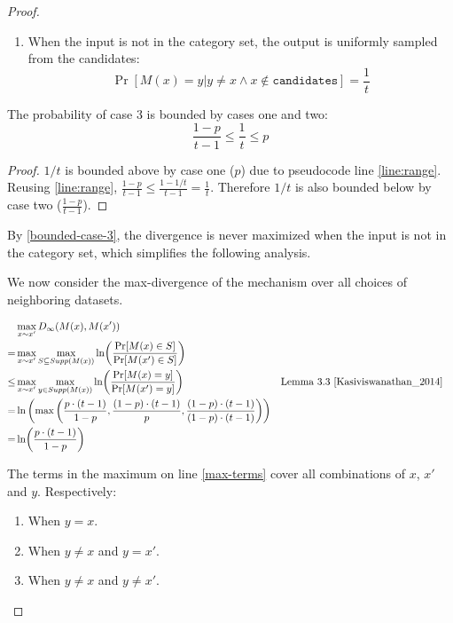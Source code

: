 \documentclass{article}
\begin{document}
\begin{proof}
\begin{enumerate}
    \item When the input is not in the category set, the output is uniformly sampled from the candidates: 
    \[
        \Pr[M(x) = y | y \ne x \wedge x \not\in \texttt{candidates}] = \frac{1}{t}
    \]
\end{enumerate}

\begin{tcolorbox}
\begin{lemma}
    \label{bounded-case-3}
    The probability of case 3 is bounded by cases one and two:
     \begin{equation}
        \frac{1 - p}{t - 1} \leq \frac{1}{t} \leq p
     \end{equation}
\end{lemma}

\begin{proof}
$1 / t$ is bounded above by case one ($p$) due to pseudocode line \ref{line:range}. 
Reusing \ref{line:range}, $\frac{1 - p}{t - 1} \leq \frac{1 - 1/t}{t - 1} = \frac{1}{t}$.
Therefore $1 / t$ is also bounded below by case two ($\frac{1 - p}{t - 1}$).
\end{proof}
\end{tcolorbox}

By \ref{bounded-case-3}, the divergence is never maximized when the input is not in the category set,
which simplifies the following analysis.

We now consider the max-divergence of the mechanism over all choices of neighboring datasets.
    
\begin{align}
    &\max_{x \sim x'} D_{\infty}(M(x), M(x')) \\
    =& \max_{x \sim x'} \max_{S \subseteq Supp(M(x))}\ln (\frac{\Pr[M(x) \in S]}{\Pr[M(x') \in S]}) \\
    \le& \max_{x \sim x'} \max_{y \in Supp(M(x))}\ln (\frac{\Pr[M(x) = y]}{\Pr[M(x') = y]}) &&\text{Lemma 3.3 } \cite{Kasiviswanathan_2014} \\
    =& \ln \left(\max\left(\frac{p \cdot (t - 1)}{1 - p}, \frac{(1 - p) \cdot (t - 1)}{p}, \frac{(1 - p) \cdot (t - 1)}{(1 - p) \cdot (t - 1)}\right)\right) \label{max-terms} \\
    =& \ln (\frac{p \cdot (t - 1)}{1 - p})
\end{align}

The terms in the maximum on line \ref{max-terms} cover all combinations of $x$, $x'$ and $y$. Respectively:
\begin{enumerate}
    \item When $y = x$.
    \item When $y \ne x$ and $y = x'$.
    \item When $y \ne x$ and $y \ne x'$.
\end{enumerate}


\end{proof}
\end{document}
